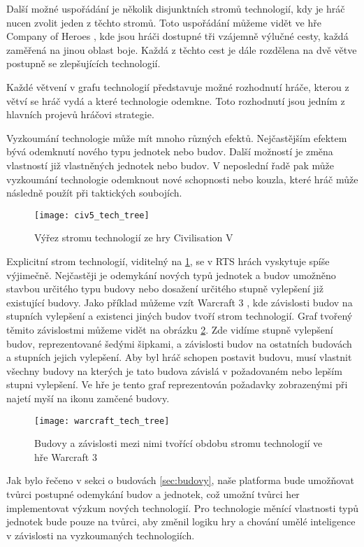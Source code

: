 Další možné uspořádání je několik disjunktních stromů technologií, kdy je hráč nucen zvolit jeden z těchto stromů. 
Toto uspořádání můžeme vidět ve hře Company of Heroes \citep{site:COH}, kde jsou hráči dostupné tři vzájemně výlučné cesty, každá zaměřená na jinou oblast boje. Každá z těchto cest je dále rozdělena na dvě větve postupně se zlepšujících technologií.

Každé větvení v grafu technologií představuje možné rozhodnutí hráče, kterou z větví se hráč vydá a které technologie odemkne. Toto rozhodnutí jsou jedním z hlavních projevů hráčovi strategie.

Vyzkoumání technologie může mít mnoho různých efektů. Nejčastějším efektem bývá odemknutí nového typu jednotek nebo budov. Další možností je změna vlastností již vlastněných jednotek nebo budov. V neposlední řadě pak může vyzkoumání technologie odemknout nové schopnosti nebo kouzla, které hráč může následně použít při taktických soubojích. 

\begin{figure}[h]	
	\centering
	\texttt{[image: civ5\_tech\_tree]}
	\caption{Výřez stromu technologií ze hry Civilisation V}
	\label{fig:civ5techtree}
\end{figure}


Explicitní strom technologií, viditelný na \ref{fig:civ5techtree}, se v RTS hrách vyskytuje spíše výjimečně. Nejčastěji je odemykání nových typů jednotek a budov umožněno stavbou určitého typu budovy nebo dosažení určitého stupně vylepšení již existující budovy. Jako příklad můžeme vzít Warcraft 3 \citep{site:warcraft3}, kde závislosti budov na stupních vylepšení a existenci jiných budov tvoří strom technologií. Graf tvořený těmito závislostmi můžeme vidět na obrázku \ref{fig:warcrafttechtree}. Zde vidíme stupně vylepšení budov, reprezentované šedými šipkami, a závislosti budov na ostatních budovách a stupních jejich vylepšení. Aby byl hráč schopen postavit budovu, musí vlastnit všechny budovy na kterých je tato budova závislá v požadovaném nebo lepším stupni vylepšení. Ve hře je tento graf reprezentován požadavky zobrazenými při najetí myší na ikonu zamčené budovy.

\begin{figure}[h]	
	\centering
	\texttt{[image: warcraft\_tech\_tree]}
	\caption{Budovy a závislosti mezi nimi tvořící obdobu stromu technologií ve hře Warcraft 3}
	\label{fig:warcrafttechtree}
\end{figure}

Jak bylo řečeno v sekci o budovách \ref{sec:budovy}, naše platforma bude umožňovat tvůrci postupné odemykání budov a jednotek, což umožní tvůrci her implementovat výzkum nových technologií. Pro technologie měnící vlastnosti typů jednotek bude pouze na tvůrci, aby změnil logiku hry a chování umělé inteligence v závislosti na vyzkoumaných technologiích.

